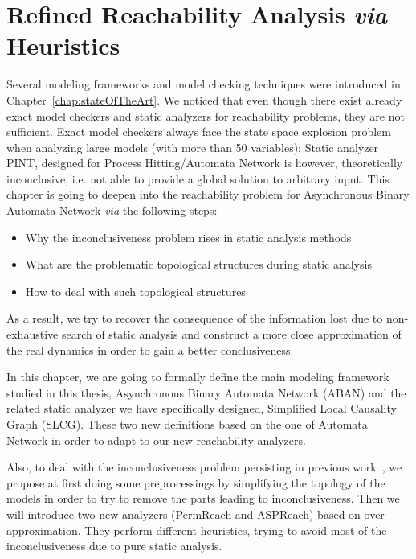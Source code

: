 \chapter{Refined Reachability Analysis \textit{via} Heuristics}\label{chap:refinement}
\begin{mybox}
Several modeling frameworks and model checking techniques were %
introduced in Chapter~\ref{chap:stateOfTheArt}.
We noticed that even though there exist already exact model checkers and static analyzers for reachability problems, they are not sufficient.
Exact model checkers always face %
the state space explosion problem when analyzing large models (with more than %
50 variables);
Static analyzer PINT, designed for Process Hitting/Automata Network is however, theoretically inconclusive, i.e. not able to provide a global solution to arbitrary input.
This chapter is going to deepen into the reachability problem for Asynchronous Binary Automata Network %
\textit{via} the following steps:

\begin{itemize}
    \item Why the inconclusiveness problem rises in static analysis methods%
    \item What are the problematic topological structures during static analysis %
    \item How to deal with such topological structures
\end{itemize}

As a result, we try to recover the consequence of the information lost due to non-exhaustive search of static analysis and construct a more close approximation of the real dynamics in order to gain a better conclusiveness.
\end{mybox}

In this chapter, we are going to formally define the main modeling framework studied in this thesis, Asynchronous Binary Automata Network (ABAN) and the %
related static analyzer we have specifically designed, 
Simplified Local Causality Graph (SLCG).
These two new definitions based on the one of Automata Network in order to adapt to our new reachability analyzers.

Also, to deal with the inconclusiveness problem persisting in previous work~\cite{folschette2015}, we propose at first doing some preprocessings by simplifying the topology of the models in order to try to remove the parts leading to inconclusiveness.
Then we will introduce two new analyzers (PermReach and ASPReach) based on over-approximation.
They perform different heuristics, trying to avoid most of the inconclusiveness due to pure static analysis.

